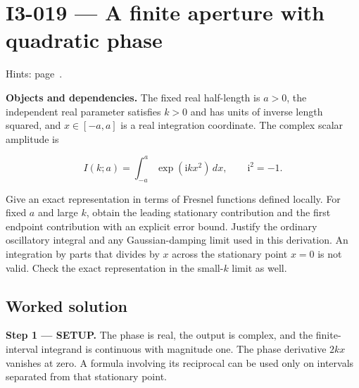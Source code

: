 \documentclass[11pt,oneside,openany]{book}
\begin{document}
\section{I3-019 --- A finite aperture with quadratic phase}
\label{problem:I3-019}
{\small Hints: page~\pageref{hints:I3-019}.}\par\medskip

\textbf{Objects and dependencies.} The fixed real half-length is \(a>0\), the independent real parameter satisfies \(k>0\) and has units of inverse length squared, and \(x\in[-a,a]\) is a real integration coordinate. The complex scalar amplitude is

\[
I(k;a)=\int_{-a}^a\exp(\mathrm{i}kx^2)\,dx,\qquad \mathrm{i}^2=-1.
\]

Give an exact representation in terms of Fresnel functions defined locally. For fixed \(a\) and large \(k\), obtain the leading stationary contribution and the first endpoint contribution with an explicit error bound. Justify the ordinary oscillatory integral and any Gaussian-damping limit used in this derivation. An integration by parts that divides by \(x\) across the stationary point \(x=0\) is not valid. Check the exact representation in the small-\(k\) limit as well.
\subsection*{Worked solution}

\textbf{Step 1 --- SETUP.} The phase is real, the output is complex, and the finite-interval integrand is continuous with magnitude one. The phase derivative \(2kx\) vanishes at zero. A formula involving its reciprocal can be used only on intervals separated from that stationary point.
\end{document}
